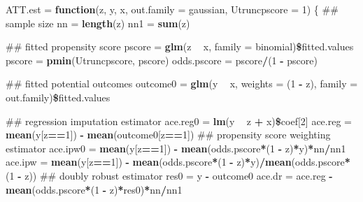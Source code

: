 \documentclass[]{article}
\newenvironment{Shaded}{\begin{snugshade}}{\end{snugshade}}
\newcommand{\KeywordTok}[1]{\textcolor[rgb]{0.13,0.29,0.53}{\textbf{#1}}}
\newcommand{\DataTypeTok}[1]{\textcolor[rgb]{0.13,0.29,0.53}{#1}}
\newcommand{\DecValTok}[1]{\textcolor[rgb]{0.00,0.00,0.81}{#1}}
\newcommand{\StringTok}[1]{\textcolor[rgb]{0.31,0.60,0.02}{#1}}
\newcommand{\ControlFlowTok}[1]{\textcolor[rgb]{0.13,0.29,0.53}{\textbf{#1}}}
\newcommand{\OperatorTok}[1]{\textcolor[rgb]{0.81,0.36,0.00}{\textbf{#1}}}
\newcommand{\NormalTok}[1]{#1}
\begin{document}
\begin{Shaded}
\begin{Highlighting}[]
\NormalTok{ATT.est =}\StringTok{ }\ControlFlowTok{function}\NormalTok{(z, y, x, }\DataTypeTok{out.family =}\NormalTok{ gaussian, }\DataTypeTok{Utruncpscore =} \DecValTok{1}\NormalTok{)}
\NormalTok{\{}
\NormalTok{  ## sample size}
\NormalTok{  nn  =}\StringTok{ }\KeywordTok{length}\NormalTok{(z)}
\NormalTok{  nn1 =}\StringTok{ }\KeywordTok{sum}\NormalTok{(z)}
  
\NormalTok{  ## fitted propensity score}
\NormalTok{  pscore   =}\StringTok{ }\KeywordTok{glm}\NormalTok{(z }\OperatorTok{~}\StringTok{ }\NormalTok{x, }\DataTypeTok{family =}\NormalTok{ binomial)}\OperatorTok{\$}\NormalTok{fitted.values}
\NormalTok{  pscore   =}\StringTok{ }\KeywordTok{pmin}\NormalTok{(Utruncpscore, pscore)}
\NormalTok{  odds.pscore =}\StringTok{ }\NormalTok{pscore}\OperatorTok{/}\NormalTok{(}\DecValTok{1} \OperatorTok{-}\StringTok{ }\NormalTok{pscore)}
  
\NormalTok{  ## fitted potential outcomes}
\NormalTok{  outcome0 =}\StringTok{ }\KeywordTok{glm}\NormalTok{(y }\OperatorTok{~}\StringTok{ }\NormalTok{x, }\DataTypeTok{weights =}\NormalTok{ (}\DecValTok{1} \OperatorTok{-}\StringTok{ }\NormalTok{z), }
                 \DataTypeTok{family =}\NormalTok{ out.family)}\OperatorTok{\$}\NormalTok{fitted.values}
  
\NormalTok{  ## regression imputation estimator}
\NormalTok{  ace.reg0 =}\StringTok{ }\KeywordTok{lm}\NormalTok{(y }\OperatorTok{~}\StringTok{ }\NormalTok{z }\OperatorTok{+}\StringTok{ }\NormalTok{x)}\OperatorTok{\$}\NormalTok{coef[}\DecValTok{2}\NormalTok{]}
\NormalTok{  ace.reg  =}\StringTok{ }\KeywordTok{mean}\NormalTok{(y[z}\OperatorTok{==}\DecValTok{1}\NormalTok{]) }\OperatorTok{-}\StringTok{ }\KeywordTok{mean}\NormalTok{(outcome0[z}\OperatorTok{==}\DecValTok{1}\NormalTok{]) }
\NormalTok{  ## propensity score weighting estimator}
\NormalTok{  ace.ipw0 =}\StringTok{ }\KeywordTok{mean}\NormalTok{(y[z}\OperatorTok{==}\DecValTok{1}\NormalTok{]) }\OperatorTok{-}\StringTok{ }
\StringTok{                }\KeywordTok{mean}\NormalTok{(odds.pscore}\OperatorTok{*}\NormalTok{(}\DecValTok{1} \OperatorTok{-}\StringTok{ }\NormalTok{z)}\OperatorTok{*}\NormalTok{y)}\OperatorTok{*}\NormalTok{nn}\OperatorTok{/}\NormalTok{nn1}
\NormalTok{  ace.ipw  =}\StringTok{ }\KeywordTok{mean}\NormalTok{(y[z}\OperatorTok{==}\DecValTok{1}\NormalTok{]) }\OperatorTok{-}\StringTok{ }
\StringTok{                }\KeywordTok{mean}\NormalTok{(odds.pscore}\OperatorTok{*}\NormalTok{(}\DecValTok{1} \OperatorTok{-}\StringTok{ }\NormalTok{z)}\OperatorTok{*}\NormalTok{y)}\OperatorTok{/}\KeywordTok{mean}\NormalTok{(odds.pscore}\OperatorTok{*}\NormalTok{(}\DecValTok{1} \OperatorTok{-}\StringTok{ }\NormalTok{z))}
\NormalTok{  ## doubly robust estimator}
\NormalTok{  res0     =}\StringTok{ }\NormalTok{y }\OperatorTok{-}\StringTok{ }\NormalTok{outcome0}
\NormalTok{  ace.dr   =}\StringTok{ }\NormalTok{ace.reg }\OperatorTok{-}\StringTok{ }\KeywordTok{mean}\NormalTok{(odds.pscore}\OperatorTok{*}\NormalTok{(}\DecValTok{1} \OperatorTok{-}\StringTok{ }\NormalTok{z)}\OperatorTok{*}\NormalTok{res0)}\OperatorTok{*}\NormalTok{nn}\OperatorTok{/}\NormalTok{nn1}
  

\end{Highlighting}
\end{Shaded}
\end{document}
